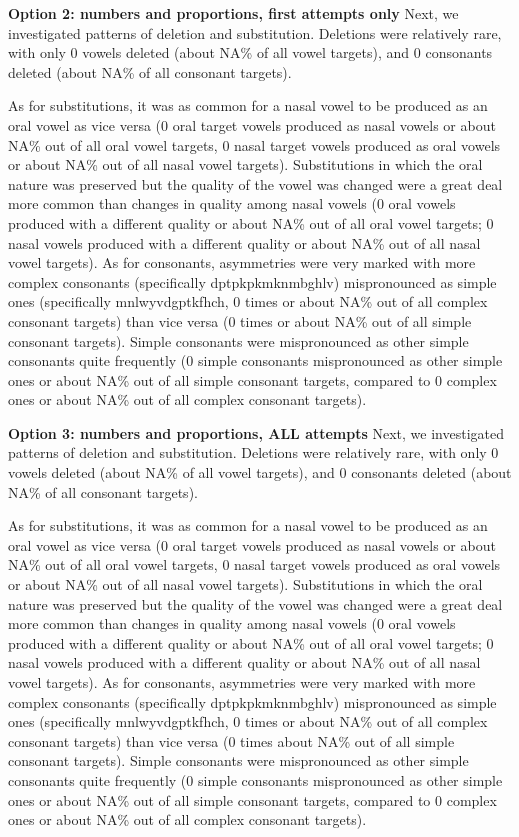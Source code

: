\documentclass[english,,man,floatsintext]{apa6}
\begin{document}
\textbf{Option 2: numbers and proportions, first attempts only} Next, we
investigated patterns of deletion and substitution. Deletions were
relatively rare, with only 0 vowels deleted (about NA\% of all vowel
targets), and 0 consonants deleted (about NA\% of all consonant
targets).

As for substitutions, it was as common for a nasal vowel to be produced
as an oral vowel as vice versa (0 oral target vowels produced as nasal
vowels or about NA\% out of all oral vowel targets, 0 nasal target
vowels produced as oral vowels or about NA\% out of all nasal vowel
targets). Substitutions in which the oral nature was preserved but the
quality of the vowel was changed were a great deal more common than
changes in quality among nasal vowels (0 oral vowels produced with a
different quality or about NA\% out of all oral vowel targets; 0 nasal
vowels produced with a different quality or about NA\% out of all nasal
vowel targets). As for consonants, asymmetries were very marked with
more complex consonants (specifically dptpkpkmknmbghlv) mispronounced as
simple ones (specifically mnlwyvdgptkfhch, 0 times or about NA\% out of
all complex consonant targets) than vice versa (0 times or about NA\%
out of all simple consonant targets). Simple consonants were
mispronounced as other simple consonants quite frequently (0 simple
consonants mispronounced as other simple ones or about NA\% out of all
simple consonant targets, compared to 0 complex ones or about NA\% out
of all complex consonant targets).

\textbf{Option 3: numbers and proportions, ALL attempts} Next, we
investigated patterns of deletion and substitution. Deletions were
relatively rare, with only 0 vowels deleted (about NA\% of all vowel
targets), and 0 consonants deleted (about NA\% of all consonant
targets).

As for substitutions, it was as common for a nasal vowel to be produced
as an oral vowel as vice versa (0 oral target vowels produced as nasal
vowels or about NA\% out of all oral vowel targets, 0 nasal target
vowels produced as oral vowels or about NA\% out of all nasal vowel
targets). Substitutions in which the oral nature was preserved but the
quality of the vowel was changed were a great deal more common than
changes in quality among nasal vowels (0 oral vowels produced with a
different quality or about NA\% out of all oral vowel targets; 0 nasal
vowels produced with a different quality or about NA\% out of all nasal
vowel targets). As for consonants, asymmetries were very marked with
more complex consonants (specifically dptpkpkmknmbghlv) mispronounced as
simple ones (specifically mnlwyvdgptkfhch, 0 times or about NA\% out of
all complex consonant targets) than vice versa (0 times about NA\% out
of all simple consonant targets). Simple consonants were mispronounced
as other simple consonants quite frequently (0 simple consonants
mispronounced as other simple ones or about NA\% out of all simple
consonant targets, compared to 0 complex ones or about NA\% out of all
complex consonant targets).
\end{document}
